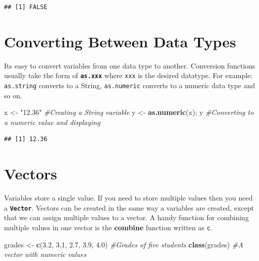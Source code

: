 \documentclass[]{krantz}
\makeatletter
\newenvironment{Shaded}{\begin{snugshade}}{\end{snugshade}}
\newcommand{\KeywordTok}[1]{\textcolor[rgb]{0.27,0.27,0.27}{\textbf{#1}}}
\newcommand{\DecValTok}[1]{\textcolor[rgb]{0.06,0.06,0.06}{#1}}
\newcommand{\FloatTok}[1]{\textcolor[rgb]{0.06,0.06,0.06}{#1}}
\newcommand{\StringTok}[1]{\textcolor[rgb]{0.5,0.5,0.5}{#1}}
\newcommand{\CommentTok}[1]{\textcolor[rgb]{0.37,0.37,0.37}{\textit{#1}}}
\newcommand{\NormalTok}[1]{#1}
\newenvironment{kframe}{%
\medskip{}
\setlength{\fboxsep}{.8em}
 \def\at@end@of@kframe{}%
 \ifinner\ifhmode%
  \def\at@end@of@kframe{\end{minipage}}%
  \begin{minipage}{\columnwidth}%
 \fi\fi%
 \def\FrameCommand##1{\hskip\@totalleftmargin \hskip-\fboxsep
 \colorbox{shadecolor}{##1}\hskip-\fboxsep
     \hskip-\linewidth \hskip-\@totalleftmargin \hskip\columnwidth}%
 \MakeFramed {\advance\hsize-\width
   \@totalleftmargin\z@ \linewidth\hsize
   \@setminipage}}%
 {\par\unskip\endMakeFramed%
 \at@end@of@kframe}
\renewenvironment{Shaded}{\begin{kframe}}{\end{kframe}}
\makeatother
\begin{document}
\begin{verbatim}
## [1] FALSE
\end{verbatim}

\section{Converting Between Data
Types}\label{converting-between-data-types}

Its easy to convert variables from one data type to another. Conversion
functions usually take the form of \textbf{\texttt{as.xxx}} where
\texttt{xxx} is the desired datatype. For example: \texttt{as.string}
converts to a String, \texttt{as.numeric} converts to a numeric data
type and so on.

\begin{Shaded}
\begin{Highlighting}[]
\NormalTok{x <-}\StringTok{ "12.36"} \CommentTok{#Creating a String variable}
\NormalTok{y <-}\StringTok{ }\KeywordTok{as.numeric}\NormalTok{(x); y }\CommentTok{#Converting to a numeric value and displaying}
\end{Highlighting}
\end{Shaded}

\begin{verbatim}
## [1] 12.36
\end{verbatim}

\section{Vectors}\label{vectors}

Variables store a single value. If you need to store multiple values
then you need a \textbf{\texttt{Vector}}. Vectors can be created in the
same way a variables are created, except that we can assign multiple
values to a vector. A handy function for combining multiple values in
one vector is the \textbf{combine} function written as \texttt{c}.

\begin{Shaded}
\begin{Highlighting}[]
\NormalTok{grades <-}\StringTok{ }\KeywordTok{c}\NormalTok{(}\FloatTok{3.2}\NormalTok{, }\DecValTok{3}\NormalTok{,}\DecValTok{1}\NormalTok{, }\FloatTok{2.7}\NormalTok{, }\FloatTok{3.9}\NormalTok{, }\FloatTok{4.0}\NormalTok{) }\CommentTok{#Grades of five students}
\KeywordTok{class}\NormalTok{(grades) }\CommentTok{#A vector with numeric values}
\end{Highlighting}
\end{Shaded}
\end{document}
